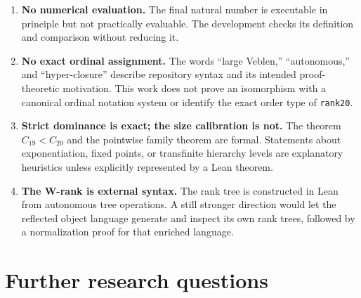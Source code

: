 \documentclass[11pt]{article}
\theoremstyle{definition}
\newcommand{\code}[1]{\texttt{#1}}
\newcommand{\Cnineteen}{C_{19}}
\newcommand{\Ctwenty}{C_{20}}
\begin{document}
\begin{enumerate}[leftmargin=2.2em]
  \item \textbf{No numerical evaluation.}  The final natural number is
  executable in principle but not practically evaluable.  The development
  checks its definition and comparison without reducing it.

  \item \textbf{No exact ordinal assignment.}  The words ``large Veblen,''
  ``autonomous,'' and ``hyper-closure'' describe repository syntax and its
  intended proof-theoretic motivation.  This work does not prove an isomorphism
  with a canonical ordinal notation system or identify the exact order type of
  \code{rank20}.

  \item \textbf{Strict dominance is exact; the size calibration is not.}
  The theorem \(\Cnineteen<\Ctwenty\) and the pointwise family theorem are
  formal.  Statements about exponentiation, fixed points, or transfinite
  hierarchy levels are explanatory heuristics unless explicitly represented
  by a Lean theorem.

  \item \textbf{The W-rank is external syntax.}  The rank tree is constructed
  in Lean from autonomous tree operations.  A still stronger direction would
  let the reflected object language generate and inspect its own rank trees,
  followed by a normalization proof for that enriched language.
\end{enumerate}

\section{Further research questions}
\end{document}
